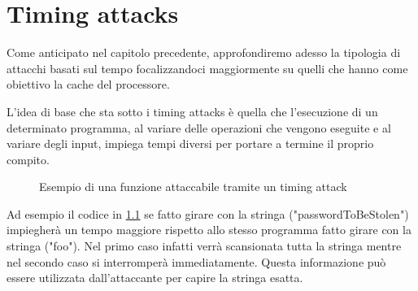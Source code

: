 \chapter{Timing attacks}
	Come anticipato nel capitolo precedente, approfondiremo adesso la tipologia di attacchi basati sul tempo focalizzandoci maggiormente su quelli che hanno come obiettivo la cache del processore. 
	
	L'idea di base che sta sotto i timing attacks è quella che l'esecuzione di un determinato programma, al variare delle operazioni che vengono eseguite e al variare degli input, impiega tempi diversi per portare a termine il proprio compito.
	
	\begin{figure}
		\begin{center}
			
			\caption{Esempio di una funzione attaccabile tramite un timing attack}
			\label{fig:timingBase}
		\end{center}
	\end{figure}
	
	Ad esempio il codice in \cref{fig:timingBase} se fatto girare con la stringa ("passwordToBeStolen") impiegherà un tempo maggiore rispetto allo stesso programma fatto girare con la stringa ("foo"). Nel primo caso infatti verrà scansionata tutta la stringa mentre nel secondo caso si interromperà immediatamente. Questa informazione può essere utilizzata dall'attaccante per capire la stringa esatta.